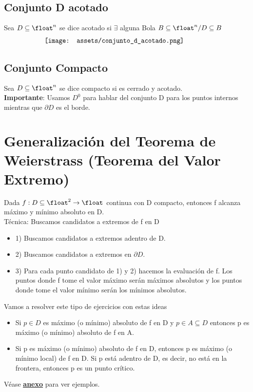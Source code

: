 \documentclass[10pt,a4paper]{article}
\begin{document}
\subsection*{Conjunto D acotado}
Sea $D \subseteq \float^{n}$ se dice acotado si $\exists$ alguna Bola $B \subseteq \float^{n} / D \subseteq B$
\[\begin{minipage}[b]{0.7\textwidth}
    \texttt{[image: assets/conjunto\_d\_acotado.png]}
\end{minipage}\]
\subsection*{Conjunto Compacto}
Sea $D \subseteq \float^{n}$ se dice compacto si es cerrado y acotado. \\
\textbf{Importante}: Usamos $D^{0}$ para hablar del conjunto D para los puntos internos mientras que $\partial D$ es el borde.
\section*{Generalización del Teorema de Weierstrass (Teorema del Valor Extremo)}
Dada $f:D \subseteq \float^{2} \rightarrow \float$ continua con D compacto, entonces f alcanza máximo y mínimo absoluto en D. \\
Técnica: Buscamos candidatos a extremos de f en D 
\begin{itemize}
    \item 1) Buscamos candidatos a extremos adentro de D.
    \item 2) Buscamos candidatos a extremos en $\partial D$.
    \item 3) Para cada punto candidato de 1) y 2) hacemos la evaluación de f. Los puntos donde f tome el valor máximo serán máximos absolutos y los puntos donde tome el valor mínimo serán los mínimos absolutos.
\end{itemize}
Vamos a resolver este tipo de ejercicios con estas ideas 
\begin{itemize}
    \item Si $p \in D$ es máximo (o mínimo) absoluto de f en D y $p \in A \subseteq D$ entonces p es máximo (o mínimo) absoluto de f en A.
    \item Si p es máximo (o mínimo) absoluto de f en D, entonces p es máximo (o mínimo local) de f en D. Si p está adentro de D, es decir,  no está en la frontera, entonces p es un punto crítico.
\end{itemize}
Véase \hyperref[subsec:teorema_weirstrass]{\textbf{\underline{anexo}}} para ver ejemplos. 
\end{document}
